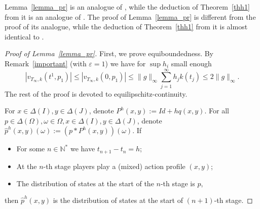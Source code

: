 \documentclass[english,openary,12pt]{article}
\theoremstyle{definition}
\newcommand{\N}{\mathbb{N}}
\begin{document}
Lemma~\ref{lemma_pr} is an analogue of \cite[Proposition~3.11]{Sor17}, while the deduction of Theorem~\ref{thh1} from it is an analogue of \cite[Proposition~3.12]{Sor17}. The proof of Lemma~\ref{lemma_pr} is different from the proof of its analogue, while the deduction of Theorem~\ref{thh1} from it is almost identical to \cite[proof of Proposition~3.12]{Sor17}.


\begin{proof}[Proof of Lemma~\ref{lemma_pr}]
First, we prove equiboundedness. 
By Remark~\ref{important} (with $\varepsilon = 1$) 
we have for $\sup h_i$ small enough
$$|v_{T_\infty,k}(t^1, p_1)| \le 
|v_{T_\infty,k}(0, p_1)| \le
\|g\|_\infty \sum_{j=1}^\infty h_j k(t_j) 
\le 
2 \|g\|_\infty.$$
The rest of the proof is devoted to equilipschitz-continuity.

For $x \in \Delta(I), y\in \Delta(J)$, denote 
$P^h(x,y) := Id + h q(x,y).$
For all
$p \in \Delta(\Omega), \omega \in \Omega, x \in \Delta(I), y \in \Delta(J)$,
denote
$\widehat p^h(x,y)(\omega) := (p * P^h(x,y)) (\omega).$
If 
\begin{itemize}
\item For some $n \in \N^*$ we have $t_{n+1} - t_n = h$;
\item At the $n$-th stage players play a (mixed) action profile $(x,y)$;
\item The distribution of states at the start of the $n$-th stage is $p$,
\end{itemize}
then $\widehat p^h(x,y)$ is the distribution of states at the start of 
$(n+1)$-th stage. 


\end{proof}
\end{document}
